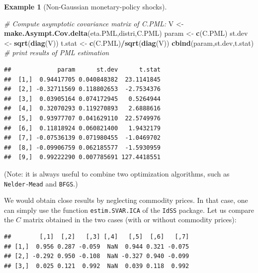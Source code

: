 \documentclass[
  12pt,
]{book}
\newenvironment{Shaded}{\begin{snugshade}}{\end{snugshade}}
\newcommand{\AttributeTok}[1]{\textcolor[rgb]{0.13,0.29,0.53}{#1}}
\newcommand{\CommentTok}[1]{\textcolor[rgb]{0.56,0.35,0.01}{\textit{#1}}}
\newcommand{\ConstantTok}[1]{\textcolor[rgb]{0.56,0.35,0.01}{#1}}
\newcommand{\DecValTok}[1]{\textcolor[rgb]{0.00,0.00,0.81}{#1}}
\newcommand{\FunctionTok}[1]{\textcolor[rgb]{0.13,0.29,0.53}{\textbf{#1}}}
\newcommand{\NormalTok}[1]{#1}
\newcommand{\OtherTok}[1]{\textcolor[rgb]{0.56,0.35,0.01}{#1}}
\newcommand{\SpecialCharTok}[1]{\textcolor[rgb]{0.81,0.36,0.00}{\textbf{#1}}}
\theoremstyle{definition}
\theoremstyle{definition}
\newtheorem{example}{Example}[chapter]
\theoremstyle{definition}
\theoremstyle{definition}
\theoremstyle{remark}
\begin{document}
\begin{example}[Non-Gaussian monetary-policy shocks]
\begin{Shaded}
\begin{Highlighting}[]
\CommentTok{\# Compute asymptotic covariance matrix of C.PML:}
\NormalTok{V }\OtherTok{\textless{}{-}} \FunctionTok{make.Asympt.Cov.delta}\NormalTok{(eta.PML,distri,C.PML)}
\NormalTok{param }\OtherTok{\textless{}{-}} \FunctionTok{c}\NormalTok{(C.PML)}
\NormalTok{st.dev }\OtherTok{\textless{}{-}} \FunctionTok{sqrt}\NormalTok{(}\FunctionTok{diag}\NormalTok{(V))}
\NormalTok{t.stat }\OtherTok{\textless{}{-}} \FunctionTok{c}\NormalTok{(C.PML)}\SpecialCharTok{/}\FunctionTok{sqrt}\NormalTok{(}\FunctionTok{diag}\NormalTok{(V))}
\FunctionTok{cbind}\NormalTok{(param,st.dev,t.stat) }\CommentTok{\# print results of PML estimation}
\end{Highlighting}
\end{Shaded}

\begin{verbatim}
##             param      st.dev      t.stat
##  [1,]  0.94417705 0.040848382  23.1141845
##  [2,] -0.32711569 0.118802653  -2.7534376
##  [3,]  0.03905164 0.074172945   0.5264944
##  [4,]  0.32070293 0.119270893   2.6888616
##  [5,]  0.93977707 0.041629110  22.5749976
##  [6,]  0.11818924 0.060821400   1.9432179
##  [7,] -0.07536139 0.071980455  -1.0469702
##  [8,] -0.09906759 0.062185577  -1.5930959
##  [9,]  0.99222290 0.007785691 127.4418551
\end{verbatim}

(Note: it is always useful to combine two optimization algorithms, such as \texttt{Nelder-Mead} and \texttt{BFGS}.)

We would obtain close results by neglecting commodity prices. In that case, one can simply use the function \texttt{estim.SVAR.ICA} of the \texttt{IdSS} package. Let us compare the \(C\) matrix obtained in the two cases (with or without commodity prices):

\begin{Shaded}
\end{Shaded}

\begin{verbatim}
##        [,1]  [,2]   [,3] [,4]   [,5]  [,6]   [,7]
## [1,]  0.956 0.287 -0.059  NaN  0.944 0.321 -0.075
## [2,] -0.292 0.950 -0.108  NaN -0.327 0.940 -0.099
## [3,]  0.025 0.121  0.992  NaN  0.039 0.118  0.992
\end{verbatim}


\end{example}
\end{document}
